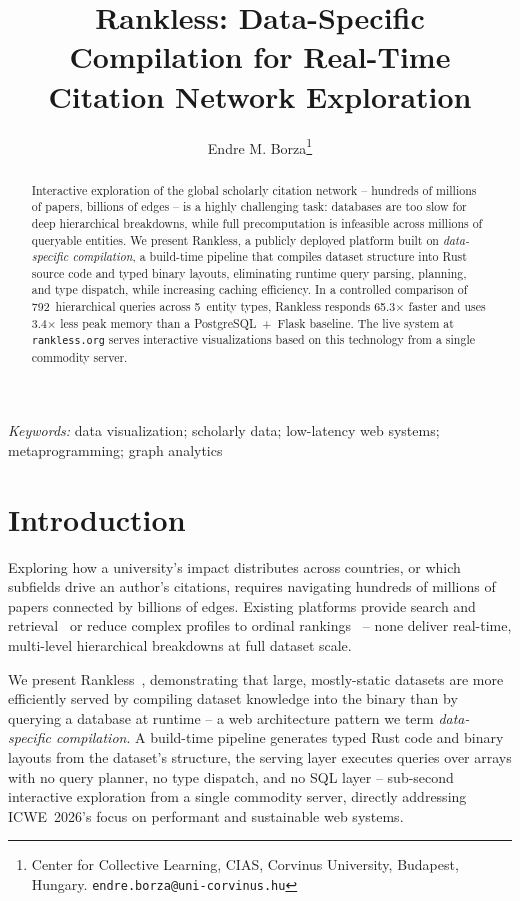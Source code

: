 \documentclass{article}
\newcommand{\evalQueries}{792}
\newcommand{\evalRootTypes}{5}
\newcommand{\evalSpeedup}{65.3}
\newcommand{\evalPeakRatio}{3.4}
\begin{document}
%
\title{Rankless: Data-Specific Compilation for Real-Time Citation Network Exploration}
%
\author{Endre M. Borza\thanks{Center for Collective Learning, CIAS, Corvinus University, Budapest, Hungary. \texttt{endre.borza@uni-corvinus.hu}}}
%
\maketitle
%
\begin{abstract}
Interactive exploration of the global scholarly citation network -- hundreds of millions of papers, billions of edges -- is a highly challenging task: databases are too slow for deep hierarchical breakdowns, while full precomputation is infeasible across millions of queryable entities. We present Rankless, a publicly deployed platform built on \emph{data-specific compilation}, a build-time pipeline that compiles dataset structure into Rust source code and typed binary layouts, eliminating runtime query parsing, planning, and type dispatch, while increasing caching efficiency. In a controlled comparison of \evalQueries{}~hierarchical queries across \evalRootTypes{}~entity types, Rankless responds \evalSpeedup{}$\times$ faster and uses \evalPeakRatio{}$\times$ less peak memory than a PostgreSQL~+~Flask baseline. The live system at \texttt{rankless.org} serves interactive visualizations based on this technology from a single commodity server.

\end{abstract}

\noindent\emph{Keywords:} data visualization; scholarly data; low-latency web systems; metaprogramming; graph analytics

%
%
\section{Introduction}
\label{sec:intro}

Exploring how a university's impact distributes across countries, or which subfields drive an author's citations, requires navigating hundreds of millions of papers connected by billions of edges. Existing platforms provide search and retrieval~\cite{semscholar,openalex} or reduce complex profiles to ordinal rankings~\cite{leiden} -- none deliver real-time, multi-level hierarchical breakdowns at full dataset scale.

We present Rankless~\cite{ranklessrepo}, demonstrating that large, mostly-static datasets are more efficiently served by compiling dataset knowledge into the binary than by querying a database at runtime -- a web architecture pattern we term \emph{data-specific compilation}. A build-time pipeline generates typed Rust code and binary layouts from the dataset's structure, the serving layer executes queries over arrays with no query planner, no type dispatch, and no SQL layer -- sub-second interactive exploration from a single commodity server, directly addressing ICWE~2026's focus on performant and sustainable web systems.
\end{document}
